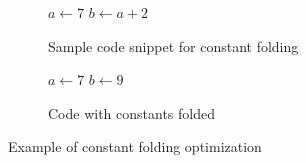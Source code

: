 \begin{figure}[h]
    \begin{subfigure}[b]{0.5\textwidth}
        \begin{algorithmic}
            \State $a \gets 7$
            \State $b \gets a + 2$
        \end{algorithmic}
        \caption{Sample code snippet for constant folding}
        \label{fig:intro:cf1}
    \end{subfigure}
    \begin{subfigure}[b]{0.5\textwidth}
        \begin{algorithmic}
            \State $a \gets 7$
            \State $b \gets 9$
        \end{algorithmic}
        \caption{Code with constants folded}
        \label{fig:intro:cf2}
    \end{subfigure}
    \caption{Example of constant folding optimization}
    \label{fig:intro:cf}
\end{figure}

